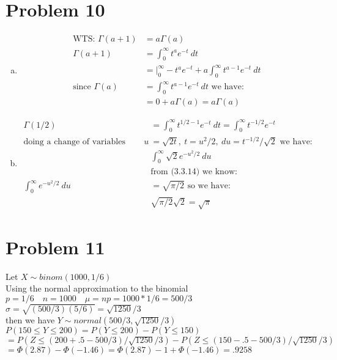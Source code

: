 \documentclass{article}
\begin{document}
\begin{flushleft}
\section*{Problem 10}
\begin{enumerate}[(a)]
\item
\begin{align*}
\text{WTS: } \Gamma(a+1)&=a \Gamma(a)\\
\Gamma(a+1)&=\int_{0}^{\infty}t^ae^{-t} \ dt\\
&=\bigg|_{0}^{\infty}-t^a e^{-t}+a\int_{0}^{\infty}t^{a-1}e^{-t} \ dt\\
\text{since } \Gamma(a)&=\int_{0}^{\infty}t^{a-1}e^{-t} \ dt \text{ we have:}\\
&=0+a\Gamma(a) =a\Gamma(a)
\end{align*}
\item 
\begin{align*}
 \Gamma(1/2)&=\int_{0}^{\infty}t^{1/2-1}e^{-t} \ dt=\int_{0}^{\infty}t^{-1/2}e^{-t}\\
\text{doing a change of variables where } u&=\sqrt{2t}, \ t=u^2/2, \ du= t^{-1/2}/\sqrt{2} \text{ we have:}\\
&\int_{0}^{\infty}\sqrt{2}e^{-u^2/2} \ du\\
&\text{from (3.3.14) we know:}\\
\int_{0}^{\infty}e^{-u^2/2} \ du&=\sqrt{\pi/2} \text{ so we have:}\\
&\sqrt{\pi/2}\sqrt{2}=\sqrt{\pi}
\end{align*} 
\end{enumerate}
\pagebreak
\section*{Problem 11}
Let $X\sim binom(1000,1/6)$\\
Using the normal approximation to the binomial\\
$p=1/6 \quad n=1000 \quad \mu =np=1000*1/6=500/3$\\
$\sigma=\sqrt{(500/3)(5/6)}=\sqrt{1250}/3$\\
then we have $Y\sim normal(500/3,\sqrt{1250}/3)$\\
$P(150 \leq Y\leq 200)=P(Y\leq 200)-P(Y\leq 150)$\\
$=P(Z \leq (200+.5-500/3)/\sqrt{1250}/3)-P(Z \leq (150-.5-500/3)/\sqrt{1250}/3)$\\
$=\Phi(2.87)-\Phi(-1.46)=\Phi(2.87)-1+\Phi(-1.46)=.9258$\\

\end{flushleft}
\end{document}
